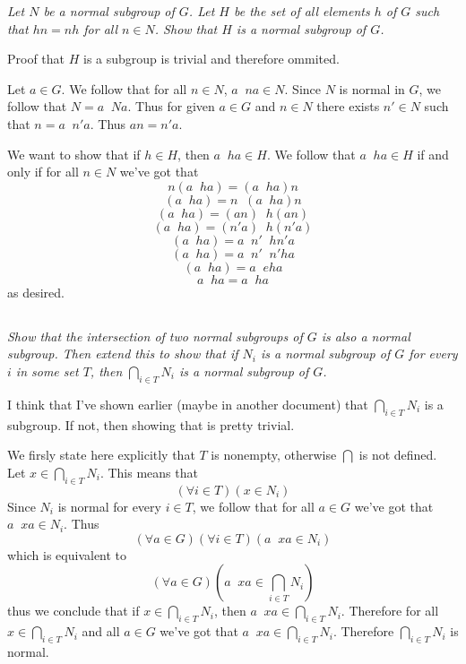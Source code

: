 \documentclass[11pt,oneside,titlepage]{book}
\DeclareMathOperator \inv {^{-1}}
\begin{document}
\textit{Let $N$ be a normal subgroup of $G$. Let $H$ be the set of all
  elements $h$ of $G$ such that
  $hn = nh$ for all $n \in N$. Show that $H$ is a normal subgroup of $G$.}

Proof that $H$ is a subgroup is trivial and therefore ommited.

Let $a \in G$. We follow that for all $n \in N$,  $a\inv n a \in N$.
Since $N$ is normal in $G$, we follow that $N = a\inv N a$. Thus 
for given $a \in G$ and  $n \in N$ there exists
$n' \in N$ such that $n = a\inv n' a$. Thus $an = n'a$.

We want to show that if $h \in H$, then $a \inv h a \in H$. We follow that
$a \inv h a \in H$ if and only if for all $n \in N$ we've got that
$$n (a \inv h a) = (a \inv h a) n$$
$$(a \inv h a) = n\inv (a \inv h a) n$$
$$(a \inv h a) = (an) \inv h (a n)$$
$$(a \inv h a) = (n'a)\inv h (n'a)$$
$$(a \inv h a) = a\inv n'\inv h n'a$$
$$(a \inv h a) = a\inv n'\inv n' ha$$
$$(a \inv h a) = a\inv e ha$$
$$a \inv h a = a\inv  ha$$
as desired.

\subsection{}

\textit{Show that the intersection of two normal subgroups of $G$ is also a normal
  subgroup. Then extend this to show that if $N_i$ is a normal subgroup of $G$ for every $i$
  in some set $T$, then $\bigcap_{i \in T}{N_i}$ is a normal subgroup of $G$.}

I think that I've shown earlier (maybe in another document) that $\bigcap_{i \in T}{N_i}$
is a subgroup. If not, then showing that is pretty trivial.

We firsly state here explicitly that $T$ is nonempty, otherwise $\bigcap$ is not defined.
Let $x \in \bigcap_{i \in T}{N_i}$. This means that
$$(\forall i \in T)(x \in N_i)$$
Since $N_i$ is normal for every $i \in T$, we follow that for all $a \in G$ we've got that
$a\inv x a \in N_i$. Thus
$$(\forall a \in G)(\forall i \in T)(a\inv x a \in N_i)$$
which is equivalent to 
$$(\forall a \in G)(a\inv x a \in \bigcap_{i \in T}{N_i})$$
thus we conclude that if $x \in \bigcap_{i \in T}{N_i}$, then $a \inv x a \in \bigcap_{i \in T}{N_i}$.
Therefore for all $x \in \bigcap_{i \in T}{N_i}$ and all $a \in G$ we've got that
$a \inv x a \in \bigcap_{i \in T}{N_i}$. Therefore $\bigcap_{i \in T}{N_i}$ is normal.

\subsection{}
\end{document}
